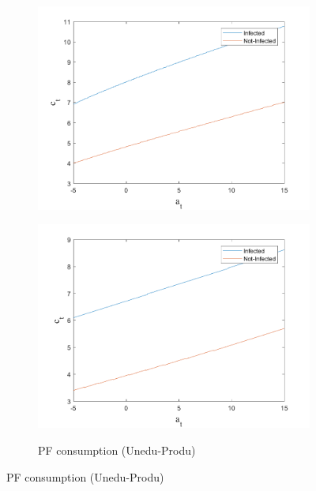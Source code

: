 \begin{figure}[H]
\begin{subfigure}{0.5\textwidth}
   \includegraphics[width=\linewidth,height = 0.22\textheight]{figures/matu/FIG8.png}
    \label{fig_dert}
\end{subfigure}
\hspace*{\fill}
\begin{subfigure}{0.5\textwidth}\caption{PF consumption (Unedu-Produ)}
   \includegraphics[width=\linewidth,height = 0.22\textheight]{figures/matu/FIG7.png}
    \label{fig:x_b}
\end{subfigure}
\hspace*{\fill}
\label{lafigura4}
\end{figure}
\newpage
